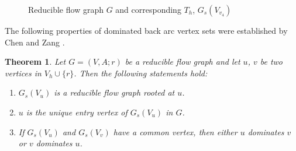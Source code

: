 \documentclass[11pt]{article}
\newtheorem{theorem}{Theorem}[section]
\begin{document}
\begin{figure}
{\begin{minipage}[t]{0.33\linewidth}
          \label{fig:2b}
    \end{minipage}}
    \caption{Reducible flow graph $G$ and corresponding $T_h$, $G_s(V_{v_4})$}
     \label{fig:2}
 \end{figure}

The following properties of dominated back arc vertex sets were established by Chen and Zang \cite{CheZ}.

\begin{theorem}
\label{thm:2}
Let $G=(V,A;r)$ be a reducible flow graph and let $u$, $v$ be two vertices in $V_h\cup\{r\}$. Then the following statements hold:
\begin{enumerate}[label=\emph{(}\alph*\emph{)}]
  \item $G_s(V_u)$ is a reducible flow graph rooted at $u$.
  \item $u$ is the unique entry vertex of $G_s(V_u)$ in $G$.
  \item If $G_s(V_u)$ and $G_s(V_v)$ have a common vertex, then either $u$ dominates $v$ or $v$ dominates $u$.
\end{enumerate}
\end{theorem}
\end{document}
